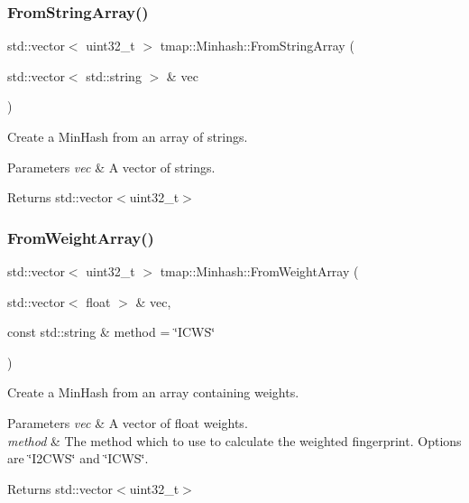 \subsubsection{\texorpdfstring{From\+String\+Array()}{FromStringArray()}}
{\footnotesize\ttfamily std\+::vector$<$ uint32\+\_\+t $>$ tmap\+::\+Minhash\+::\+From\+String\+Array (\begin{DoxyParamCaption}\item[{std\+::vector$<$ std\+::string $>$ \&}]{vec }\end{DoxyParamCaption})}



Create a Min\+Hash from an array of strings. 


\begin{DoxyParams}{Parameters}
{\em vec} & A vector of strings. \\
\hline
\end{DoxyParams}
\begin{DoxyReturn}{Returns}
std\+::vector$<$uint32\+\_\+t$>$ 
\end{DoxyReturn}
\mbox{\label{classtmap_1_1Minhash_aac0a45bdf6a6517e711a171357c8c73b}} 
\subsubsection{\texorpdfstring{From\+Weight\+Array()}{FromWeightArray()}}
{\footnotesize\ttfamily std\+::vector$<$ uint32\+\_\+t $>$ tmap\+::\+Minhash\+::\+From\+Weight\+Array (\begin{DoxyParamCaption}\item[{std\+::vector$<$ float $>$ \&}]{vec,  }\item[{const std\+::string \&}]{method = {\ttfamily \char`\"{}ICWS\char`\"{}} }\end{DoxyParamCaption})}



Create a Min\+Hash from an array containing weights. 


\begin{DoxyParams}{Parameters}
{\em vec} & A vector of float weights. \\
\hline
{\em method} & The method which to use to calculate the weighted fingerprint. Options are \char`\"{}\+I2\+C\+W\+S\char`\"{} and \char`\"{}\+I\+C\+W\+S\char`\"{}. \\
\hline
\end{DoxyParams}
\begin{DoxyReturn}{Returns}
std\+::vector$<$uint32\+\_\+t$>$ 
\end{DoxyReturn}
\mbox{\label{classtmap_1_1Minhash_a21df254dd86462a1dcbe45285c747e71}} 
